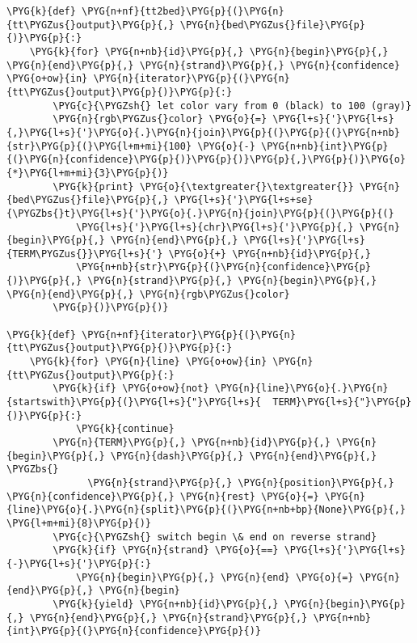 \begin{Verbatim}[commandchars=\\\{\}]
\PYG{k}{def} \PYG{n+nf}{tt2bed}\PYG{p}{(}\PYG{n}{tt\PYGZus{}output}\PYG{p}{,} \PYG{n}{bed\PYGZus{}file}\PYG{p}{)}\PYG{p}{:}
    \PYG{k}{for} \PYG{n+nb}{id}\PYG{p}{,} \PYG{n}{begin}\PYG{p}{,} \PYG{n}{end}\PYG{p}{,} \PYG{n}{strand}\PYG{p}{,} \PYG{n}{confidence} \PYG{o+ow}{in} \PYG{n}{iterator}\PYG{p}{(}\PYG{n}{tt\PYGZus{}output}\PYG{p}{)}\PYG{p}{:}
        \PYG{c}{\PYGZsh{} let color vary from 0 (black) to 100 (gray)}
        \PYG{n}{rgb\PYGZus{}color} \PYG{o}{=} \PYG{l+s}{'}\PYG{l+s}{,}\PYG{l+s}{'}\PYG{o}{.}\PYG{n}{join}\PYG{p}{(}\PYG{p}{(}\PYG{n+nb}{str}\PYG{p}{(}\PYG{l+m+mi}{100} \PYG{o}{-} \PYG{n+nb}{int}\PYG{p}{(}\PYG{n}{confidence}\PYG{p}{)}\PYG{p}{)}\PYG{p}{,}\PYG{p}{)}\PYG{o}{*}\PYG{l+m+mi}{3}\PYG{p}{)}
        \PYG{k}{print} \PYG{o}{\textgreater{}\textgreater{}} \PYG{n}{bed\PYGZus{}file}\PYG{p}{,} \PYG{l+s}{'}\PYG{l+s+se}{\PYGZbs{}t}\PYG{l+s}{'}\PYG{o}{.}\PYG{n}{join}\PYG{p}{(}\PYG{p}{(}
            \PYG{l+s}{'}\PYG{l+s}{chr}\PYG{l+s}{'}\PYG{p}{,} \PYG{n}{begin}\PYG{p}{,} \PYG{n}{end}\PYG{p}{,} \PYG{l+s}{'}\PYG{l+s}{TERM\PYGZus{}}\PYG{l+s}{'} \PYG{o}{+} \PYG{n+nb}{id}\PYG{p}{,}
            \PYG{n+nb}{str}\PYG{p}{(}\PYG{n}{confidence}\PYG{p}{)}\PYG{p}{,} \PYG{n}{strand}\PYG{p}{,} \PYG{n}{begin}\PYG{p}{,} \PYG{n}{end}\PYG{p}{,} \PYG{n}{rgb\PYGZus{}color}
        \PYG{p}{)}\PYG{p}{)}

\PYG{k}{def} \PYG{n+nf}{iterator}\PYG{p}{(}\PYG{n}{tt\PYGZus{}output}\PYG{p}{)}\PYG{p}{:}
    \PYG{k}{for} \PYG{n}{line} \PYG{o+ow}{in} \PYG{n}{tt\PYGZus{}output}\PYG{p}{:}
        \PYG{k}{if} \PYG{o+ow}{not} \PYG{n}{line}\PYG{o}{.}\PYG{n}{startswith}\PYG{p}{(}\PYG{l+s}{"}\PYG{l+s}{  TERM}\PYG{l+s}{"}\PYG{p}{)}\PYG{p}{:}
            \PYG{k}{continue}
        \PYG{n}{TERM}\PYG{p}{,} \PYG{n+nb}{id}\PYG{p}{,} \PYG{n}{begin}\PYG{p}{,} \PYG{n}{dash}\PYG{p}{,} \PYG{n}{end}\PYG{p}{,} \PYGZbs{}
              \PYG{n}{strand}\PYG{p}{,} \PYG{n}{position}\PYG{p}{,} \PYG{n}{confidence}\PYG{p}{,} \PYG{n}{rest} \PYG{o}{=} \PYG{n}{line}\PYG{o}{.}\PYG{n}{split}\PYG{p}{(}\PYG{n+nb+bp}{None}\PYG{p}{,} \PYG{l+m+mi}{8}\PYG{p}{)}
        \PYG{c}{\PYGZsh{} switch begin \& end on reverse strand}
        \PYG{k}{if} \PYG{n}{strand} \PYG{o}{==} \PYG{l+s}{'}\PYG{l+s}{-}\PYG{l+s}{'}\PYG{p}{:}
            \PYG{n}{begin}\PYG{p}{,} \PYG{n}{end} \PYG{o}{=} \PYG{n}{end}\PYG{p}{,} \PYG{n}{begin}
        \PYG{k}{yield} \PYG{n+nb}{id}\PYG{p}{,} \PYG{n}{begin}\PYG{p}{,} \PYG{n}{end}\PYG{p}{,} \PYG{n}{strand}\PYG{p}{,} \PYG{n+nb}{int}\PYG{p}{(}\PYG{n}{confidence}\PYG{p}{)}
\end{Verbatim}


